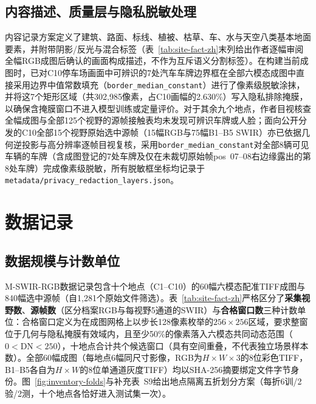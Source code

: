 \documentclass[UTF8,a4paper,10pt]{ctexart}
\begin{document}
\subsection{内容描述、质量层与隐私脱敏处理}
内容记录方案定义了建筑、路面、标线、植被、枯草、车、水与天空八类基本地面要素，并附带阴影/反光与混合标签（表~\ref{tab:site-fact-zh}末列给出作者逐幅审阅全幅RGB成图后确认的画面构成描述，不作为互斥语义分割标签）。在构建当前成图时，已对C10停车场画面中可辨识的7处汽车车牌边界框在全部六模态成图中直接采用边界中值常数填充（\texttt{border\_median\_constant}）进行了像素级脱敏涂抹，并将这7个矩形区域（共302{,}985像素，占C10画幅的2.630\%）写入隐私排除掩膜，以确保含掩膜窗口不进入模型训练或定量评价。对于其余九个地点，作者目视核查全幅成图与全部125个视野的源帧接触表均未发现可辨识车牌或人脸；面向公开分发的C10全部15个视野原始选中源帧（15幅RGB与75幅B1--B5 SWIR）亦已依据几何逆投影与高分辨率逐帧目视复核，采用\texttt{border\_median\_constant}对全部8辆可见车辆的车牌（含成图登记的7处车牌及仅在未裁切原始帧pos~07--08右边缘露出的第8处车牌）完成像素级脱敏，所有脱敏框坐标均记录于\texttt{metadata/privacy\_redaction\_layers.json}。

\section{数据记录}\label{sec:records}
\subsection{数据规模与计数单位}
M-SWIR-RGB数据记录\cite{du2026mswirrgb_data}包含十个地点（C1--C10）的60幅六模态配准TIFF成图与840幅选中源帧（自1{,}281个原始文件筛选）。表~\ref{tab:site-fact-zh}严格区分了\textbf{采集视野数}、\textbf{源帧数}（区分档案RGB与每视野5通道的SWIR）与\textbf{合格窗口数}三种计数单位：合格窗口定义为在成图网格上以步长128像素枚举的$256\times256$区域，要求整窗位于几何与隐私掩膜有效域内，且至少50\%的像素落入六模态共同动态范围（$0<\mathrm{DN}<250$），十地点合计共\QualifiedWindowCount{}个候选窗口（具有空间重叠，不代表独立场景样本数）。全部60幅成图（每地点6幅同尺寸影像，RGB为$H\times W\times3$的8位彩色TIFF，B1--B5各自为$H\times W$的8位单通道灰度TIFF）均以SHA-256摘要绑定文件字节身份。图~\ref{fig:inventory-folds}与补充表~S9给出地点隔离五折划分方案（每折6训/2验/2测，十个地点各恰好进入测试集一次）。

\begin{table}[htbp]
\centering
\caption{逐地点的采集规模、日期溯源、成图画幅与画面构成概况。}
\label{tab:site-fact-zh}
\small
\begingroup\footnotesize\setlength{\tabcolsep}{3pt}\endgroup
\end{table}
\end{document}
